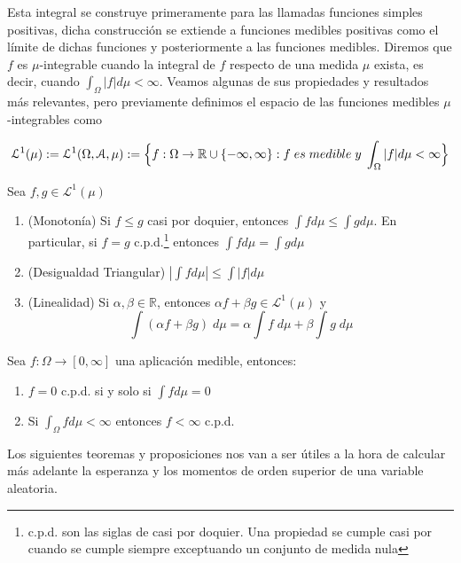     Esta integral se construye primeramente para las llamadas funciones simples positivas, dicha construcción se extiende a funciones medibles positivas como el límite de dichas funciones y posteriormente a las funciones medibles. Diremos que $f$ es $\mu$-integrable cuando la integral de $f$ respecto de una medida $\mu$ exista, es decir, cuando $\int_{\Omega}|f| d\mu < \infty$. Veamos algunas de sus propiedades y resultados más relevantes, pero previamente definimos el espacio de las funciones medibles $\mu$-integrables como 
    
    $$\mathcal{L}^1(\mu):= \mathcal{L}^1(\Omega, \mathcal{A}, \mu) := \Bigl\{ f:\Omega \to \mathbb{R}\cup\{-\infty,\infty\}: f \; es \; medible \; y \; \int_{\Omega} |f| d\mu < \infty \Bigl\}$$
    
    \begin{proposicion}[Propiedades]
    Sea $f,g \in \mathcal{L}^1(\mu)$
    \begin{enumerate}
        \item (Monotonía) Si $f\leq g$ casi por doquier, entonces $\int f d\mu \leq \int g d\mu$. En particular, si $f=g$ c.p.d.\footnote{c.p.d. son las siglas de casi por doquier. Una propiedad se cumple casi por cuando se cumple siempre exceptuando un conjunto de medida nula} entonces $\int f d\mu = \int g d\mu$
        \item (Desigualdad Triangular) $ |\int f d\mu| \leq \int |f| d\mu$
        \item (Linealidad) Si $\alpha, \beta \in \mathbb{R}$, entonces $\alpha f + \beta g \in \mathcal{L}^1(\mu)$ y 
        $$ \int (\alpha f + \beta g) \; d\mu = \alpha \int f \; d\mu + \beta \int g \; d\mu $$
    \end{enumerate}
    \end{proposicion}
    
    \begin{proposicion}
    Sea $f:\Omega \to [0,\infty]$ una aplicación medible, entonces:
    \begin{enumerate}
        \item $f=0$ c.p.d. si y solo si $\int f d\mu = 0$
        \item Si $\int_{\Omega} f d\mu < \infty$ entonces $f < \infty$ c.p.d.
    \end{enumerate}
    \end{proposicion}
    
    Los siguientes teoremas y proposiciones nos van a ser útiles a la hora de calcular más adelante la esperanza y los momentos de orden superior de una variable aleatoria.
    
